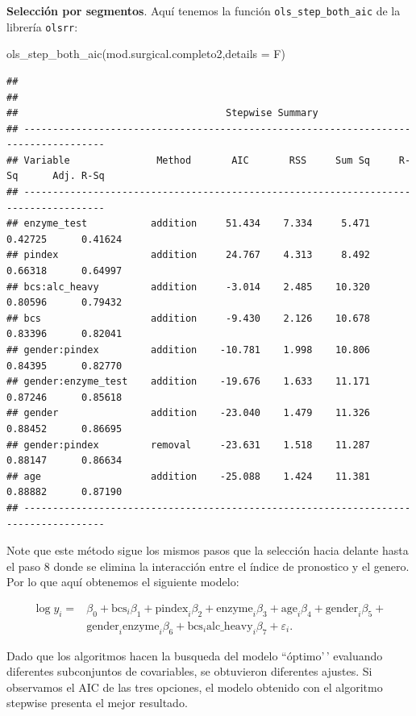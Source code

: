 \documentclass[
]{article}
\newenvironment{Shaded}{\begin{snugshade}}{\end{snugshade}}
\newcommand{\AttributeTok}[1]{\textcolor[rgb]{0.77,0.63,0.00}{#1}}
\newcommand{\FunctionTok}[1]{\textcolor[rgb]{0.00,0.00,0.00}{#1}}
\newcommand{\NormalTok}[1]{#1}
\begin{document}
\textbf{Selección por segmentos}. Aquí tenemos la función \texttt{ols\_step\_both\_aic} de la librería \texttt{olsrr}:

\begin{Shaded}
\begin{Highlighting}[]
\FunctionTok{ols\_step\_both\_aic}\NormalTok{(mod.surgical.completo2,}\AttributeTok{details =}\NormalTok{ F)}
\end{Highlighting}
\end{Shaded}

\begin{verbatim}
## 
## 
##                                    Stepwise Summary                                   
## ------------------------------------------------------------------------------------
## Variable               Method       AIC       RSS     Sum Sq     R-Sq      Adj. R-Sq 
## ------------------------------------------------------------------------------------
## enzyme_test           addition     51.434    7.334     5.471    0.42725      0.41624 
## pindex                addition     24.767    4.313     8.492    0.66318      0.64997 
## bcs:alc_heavy         addition     -3.014    2.485    10.320    0.80596      0.79432 
## bcs                   addition     -9.430    2.126    10.678    0.83396      0.82041 
## gender:pindex         addition    -10.781    1.998    10.806    0.84395      0.82770 
## gender:enzyme_test    addition    -19.676    1.633    11.171    0.87246      0.85618 
## gender                addition    -23.040    1.479    11.326    0.88452      0.86695 
## gender:pindex         removal     -23.631    1.518    11.287    0.88147      0.86634 
## age                   addition    -25.088    1.424    11.381    0.88882      0.87190 
## ------------------------------------------------------------------------------------
\end{verbatim}

Note que este método sigue los mismos pasos que la selección hacia delante hasta el paso 8 donde se elimina la interacción entre el índice de pronostico y el genero. Por lo que aquí obtenemos el siguiente modelo:

\begin{equation}
\begin{split}
\log y_{i} =& \beta_{0} + \mbox{bcs}_{i}\beta_{1} + \mbox{pindex}_{i}\beta_{2} + \mbox{enzyme}_{i}\beta_{3} + \mbox{age}_{i}\beta_{4} + \mbox{gender}_{i}\beta_{5} + \\
& \mbox{gender}_{i}\mbox{enzyme}_{i}\beta_{6} + \mbox{bcs}_{i}\mbox{alc_heavy}_{i}\beta_{7} + \varepsilon_{i}.
\end{split}
\nonumber
\end{equation}

Dado que los algoritmos hacen la busqueda del modelo ``óptimo'\,' evaluando diferentes subconjuntos de covariables, se obtuvieron diferentes ajustes. Si observamos el AIC de las tres opciones, el modelo obtenido con el algoritmo stepwise presenta el mejor resultado.

  
\end{document}
